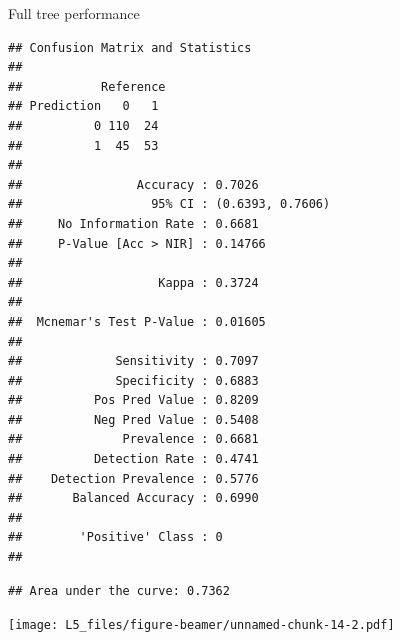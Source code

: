 \documentclass[
  ignorenonframetext,
]{beamer}
\begin{document}
\begin{frame}[fragile]
\begin{block}{Full tree performance}
\begin{verbatim}
## Confusion Matrix and Statistics
## 
##           Reference
## Prediction   0   1
##          0 110  24
##          1  45  53
##                                           
##                Accuracy : 0.7026          
##                  95% CI : (0.6393, 0.7606)
##     No Information Rate : 0.6681          
##     P-Value [Acc > NIR] : 0.14766         
##                                           
##                   Kappa : 0.3724          
##                                           
##  Mcnemar's Test P-Value : 0.01605         
##                                           
##             Sensitivity : 0.7097          
##             Specificity : 0.6883          
##          Pos Pred Value : 0.8209          
##          Neg Pred Value : 0.5408          
##              Prevalence : 0.6681          
##          Detection Rate : 0.4741          
##    Detection Prevalence : 0.5776          
##       Balanced Accuracy : 0.6990          
##                                           
##        'Positive' Class : 0               
## 
\end{verbatim}

\begin{verbatim}
## Area under the curve: 0.7362
\end{verbatim}

\texttt{[image: L5\_files/figure-beamer/unnamed-chunk-14-2.pdf]}

\end{block}

\end{frame}
\end{document}
